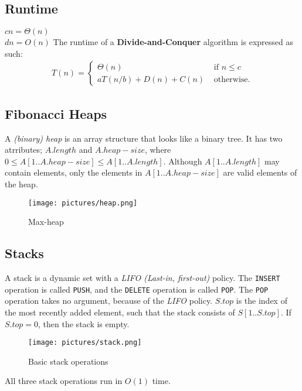 \subsection*{Runtime}
$cn=\Theta(n)$\\
$dn=O(n)$
\newline\newline
The runtime of a \textbf{Divide-and-Conquer} algorithm is expressed as such:
\begin{align*}
  T(n)=
  \begin{cases}
    \Theta(n)&\textrm{ if }n\leq c\\
    aT(n/b)+D(n)+C(n)&\textrm{ otherwise.}
  \end{cases}
\end{align*}
\subsection*{Fibonacci Heaps}
A \textit{(binary) heap} is an array structure that looks like a binary tree.
It has two atrributes; $A.length$ and $A.heap-size$, where $0\leq
A[1..A.heap-size]\leq A[1..A.length]$.\newline
Although $A[1..A.length]$ may contain elements, only the elements in
$A[1..A.heap-size]$ are valid elements of the heap.
\begin{figure}[H]
  \centering
  \texttt{[image: pictures/heap.png]}
  \caption{Max-heap}
\end{figure}
\subsection*{Stacks}
A stack is a dynamic set with a \textit{LIFO (Last-in, first-out)} policy. The
\texttt{INSERT} operation is called \texttt{PUSH}, and the \texttt{DELETE}
operation is called \texttt{POP}. The \texttt{POP} operation takes no argument,
because of the \textit{LIFO} policy.\newline\newline
$S.top$ is the index of the most recently added element, such that the stack
consists of $S[1..S.top]$. If $S.top=0$, then the stack is empty.
\begin{figure}[H]
  \centering
  \texttt{[image: pictures/stack.png]}
  \caption{Basic stack operations}
\end{figure}
All three stack operations run in $O(1)$ time.
